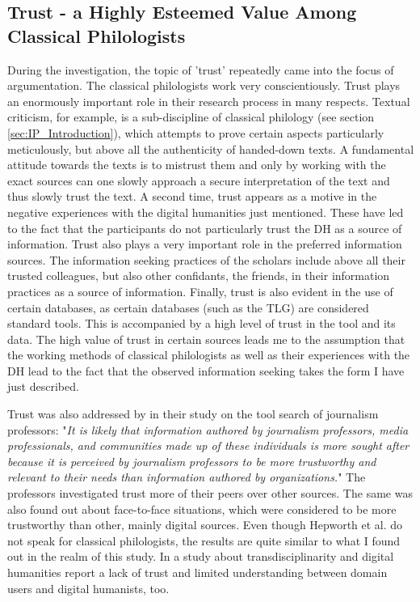 \documentclass[12pt, a4paper, titlepage, oneside, abstract=true, toc=listof, toc=bibliography, BCOR=1cm]{scrreprt}
\begin{document}
{\subsection*{Trust - a Highly Esteemed Value Among Classical Philologists}
During the investigation, the topic of 'trust' repeatedly came into the focus of argumentation. The classical philologists work very conscientiously. Trust plays an enormously important role in their research process in many respects. Textual criticism, for example, is a sub-discipline of classical philology (see section \ref{sec:IP_Introduction}), which attempts to prove certain aspects particularly meticulously, but above all the authenticity of handed-down texts. A fundamental attitude towards the texts is to mistrust them and only by working with the exact sources can one slowly approach a secure interpretation of the text and thus slowly trust the text. A second time, trust appears as a motive in the negative experiences with the digital humanities just mentioned. These have led to the fact that the participants do not particularly trust the DH as a source of information. Trust also plays a very important role in the preferred information sources. The information seeking practices of the scholars include above all their trusted colleagues, but also other confidants, the friends, in their information practices as a source of information. Finally, trust is also evident in the use of certain databases, as certain databases (such as the TLG) are considered standard tools. This is accompanied by a high level of trust in the tool and its data. The high value of trust in certain sources leads me to the assumption that the working methods of classical philologists as well as their experiences with the DH lead to the fact that the observed information seeking takes the form I have just described.

Trust was also addressed by \citet[p. 266]{Hepworth2017} in their study on the tool search of journalism professors: "\textit{It is likely that information authored by journalism professors, media professionals, and communities made up of these individuals is more sought after because it is perceived by journalism professors to be more trustworthy and relevant to their needs than information authored by organizations.}" The professors investigated trust more of their peers over other sources. The same was also found out about face-to-face situations, which were considered to be more trustworthy than other, mainly digital sources. Even though Hepworth et al. do not speak for classical philologists, the results are quite similar to what I found out in the realm of this study. In a study about transdisciplinarity and digital humanities \citet[p. 305]{Lin2012} report a lack of trust and limited understanding between domain users and digital humanists, too. 

}
\end{document}
